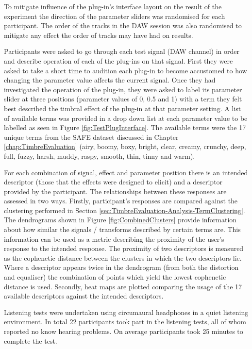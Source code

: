 			To mitigate influence of the plug-in's interface layout on the result of the experiment the
			direction of the parameter sliders was randomised for each participant. The order of the tracks in
			the DAW session was also randomised to mitigate any effect the order of tracks may have had on
			results.

			Participants were asked to go through each test signal (DAW channel) in order and describe
			operation of each of the plug-ins on that signal. First they were asked to take a short time to
			audition each plug-in to become accustomed to how changing the parameter value affects the current
			signal. Once they had investigated the operation of the plug-in, they were asked to label its
			parameter slider at three positions (parameter values of 0, 0.5 and 1) with a term they felt best
			described the timbral effect of the plug-in at that parameter setting. A list of available terms
			was provided in a drop down list at each parameter value to be labelled as seen in Figure
			\ref{fig:TestPlugInterface}. The available terms were the 17 unique terms from the SAFE dataset
			discussed in Chapter \ref{chap:TimbreEvaluation} (airy, boomy, boxy, bright, clear, creamy,
			crunchy, deep, full, fuzzy, harsh, muddy, raspy, smooth, thin, tinny and warm).

			For each combination of signal, effect and parameter position there is an intended descriptor
			(those that the effects were designed to elicit) and a descriptor provided by the participant. The
			relationships between these responses are assessed in two ways. Firstly, participant's responses
			are compared against the clustering performed in Section
			\ref{sec:TimbreEvaluation-Analysis-TermClustering}. The dendrograms shown in Figure
			\ref{fig:CombinedClusters} provide information about how similar the signals / transforms described
			by certain terms are. This information can be used as a metric describing the proximity of the
			user's response to the intended response. The proximity of two descriptors is measured as the
			cophenetic distance between the clusters in which the two descriptors lie. Where a descriptor
			appears twice in the dendrogram (from both the distortion and equaliser) the combination of points
			which yield the lowest cophenetic distance is used. Secondly, heat maps are plotted comparing the
			usage of the 17 available descriptors against the intended descriptors.

			Listening tests were undertaken using circumaural headphones in a quiet listening environment. In
			total 22 participants took part in the listening tests, all of whom reported no know hearing
			problems. On average participants took 25 minutes to complete the test.

